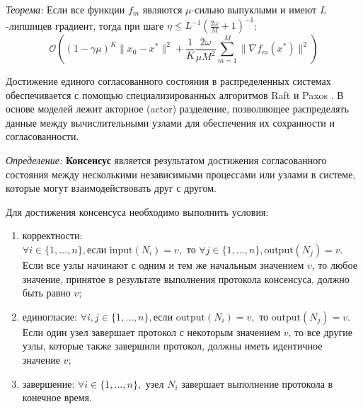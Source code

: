 \textit{Теорема:}\cite{stich2019unified} Если все функции $f_m$ являются $\mu$-сильно выпуклыми
и имеют $L$-липшицев градиент, тогда при шаге $\eta \le L^{-1} (\frac{2 \omega}{M}+1)^{-1}$:
\begin{equation}
    \mathcal{O}\left(
        (1-\gamma \mu)^K \|x_0 -x^*\|^2 + \frac{1}{K} \frac{2 \omega}{\mu M^2} \sum_{m=1}^M \| \nabla f_m(x^*) \|^2
    \right)
\end{equation}

Достижение единого согласованного состояния в распределенных системах обеспечивается с помощью специализированных алгоритмов  
Raft \cite{lamport2019time} и Paxos \cite{pease1980reaching}. 
В основе моделей лежит акторное (actor) разделение, позволяющее распределять данные между вычислительными узлами для обеспечения их 
сохранности и согласованности. 

\textit{Определение:} \textbf{Консенсус} является результатом достижения согласованного состояния между несколькими независимыми 
процессами или узлами в системе, которые могут взаимодействовать друг с другом. 

Для достижения консенсуса необходимо выполнить условия:
 \begin{enumerate}
    \item корректности: $\forall i \in \{1, \ldots, n\}, \text{если } \text{input}(N_i) = v, \text{ то } \forall j \in \{1, \ldots, n\}, \text{output}(N_j) = v$.
     Если все узлы начинают с одним и тем же начальным значением \( v \), то любое значение, принятое в результате 
     выполнения протокола консенсуса, должно быть равно \( v \);
    \item единогласие: $\forall i, j \in \{1, \ldots, n\}, \text{если } \text{output}(N_i) = v, \text{ то } \text{output}(N_j) = v$.
     Если один узел завершает протокол с некоторым значением \( v \), то все другие узлы, которые также завершили протокол,
     должны иметь идентичное значение \( v \);
    \item завершение: $\forall i \in \{1, \ldots, n\}, \text{ узел } N_i$ 
    завершает выполнение протокола в конечное время.
\end{enumerate}



